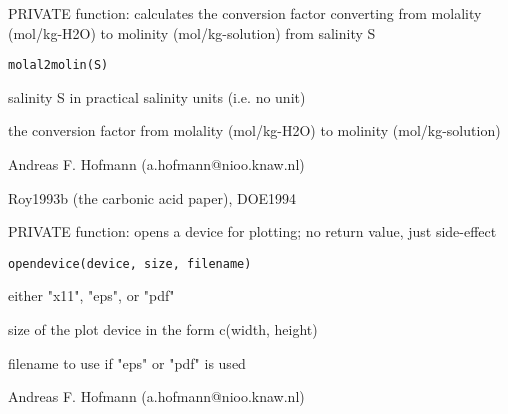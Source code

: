 \documentclass{article}
\begin{document}
\begin{Description}\relax
PRIVATE function: calculates the conversion factor converting from molality (mol/kg-H2O) to molinity (mol/kg-solution) from salinity S
\end{Description}
\begin{Usage}
\begin{verbatim}molal2molin(S)\end{verbatim}
\end{Usage}
\begin{Arguments}
\begin{ldescription}
\item[\code{S }] salinity S in practical salinity units (i.e. no unit)
\end{ldescription}
\end{Arguments}
\begin{Value}
the conversion factor from molality (mol/kg-H2O) to molinity (mol/kg-solution)
\end{Value}
\begin{Author}\relax
Andreas F. Hofmann (a.hofmann@nioo.knaw.nl)
\end{Author}
\begin{References}\relax
Roy1993b (the carbonic acid paper), DOE1994
\end{References}

\begin{Description}\relax
PRIVATE function: opens a device for plotting; no return value, just side-effect
\end{Description}
\begin{Usage}
\begin{verbatim}opendevice(device, size, filename)\end{verbatim}
\end{Usage}
\begin{Arguments}
\begin{ldescription}
\item[\code{device }] either "x11", "eps", or "pdf"
\item[\code{size }] size of the plot device in the form c(width, height)
\item[\code{filename }] filename to use if "eps" or "pdf" is used
\end{ldescription}
\end{Arguments}
\begin{Author}\relax
Andreas F. Hofmann (a.hofmann@nioo.knaw.nl)
\end{Author}
\end{document}
